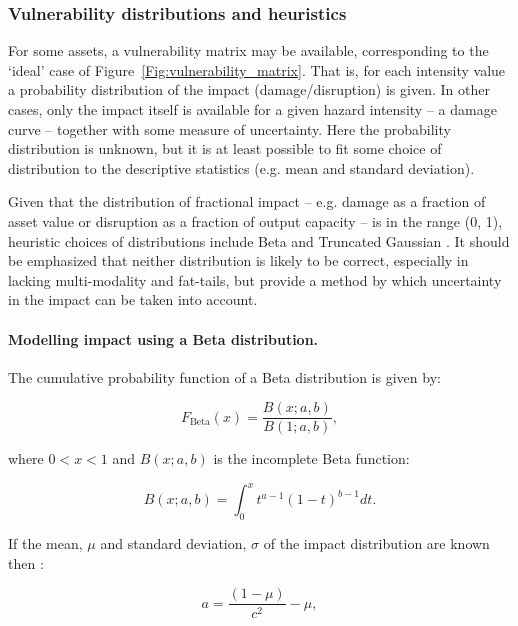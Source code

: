 \documentclass[a4paper,11pt]{extarticle} %
\theoremstyle{definition}
\begin{document}
\subsubsection{Vulnerability distributions and heuristics}
For some assets, a vulnerability matrix may be available, corresponding to the `ideal' case  of Figure~\ref{Fig:vulnerability_matrix}. That is, for each intensity value a probability distribution of the impact (damage/disruption) is given. In other cases, only the impact itself is available for a given hazard intensity -- a damage curve -- together with some measure of uncertainty. Here the probability distribution is unknown, but it is at least possible to fit some choice of distribution to the descriptive statistics (e.g. mean and standard deviation).

Given that the distribution of fractional impact -- e.g. damage  as a fraction of asset value or disruption as a fraction of output capacity -- is in the range  (0, 1), heuristic choices of distributions include Beta and Truncated Gaussian \cite{MitchellEtAl:2017}. It should be emphasized that neither distribution is likely to be correct, especially in lacking multi-modality and fat-tails, but provide a method by which uncertainty in the impact can be taken into account.

\paragraph{Modelling impact using a Beta distribution.}
The cumulative probability function of a Beta distribution is given by:

\begin{equation}
    \label{Eq:Beta1}
    F_{\text{Beta}}(x) = \frac{B(x; a, b)}{B(1; a, b)} ,
\end{equation}

where $0 < x < 1$ and $B(x; a, b)$ is the incomplete Beta function:

\begin{equation}
    \label{Eq:IncompleteBeta}
    B(x; a, b) = \int_0^{x} t^{a-1} (1 - t)^{b-1} dt .
\end{equation}

If the mean, $\mu$ and standard deviation, $\sigma$ of the impact distribution are known then \cite{MitchellEtAl:2017}:

\begin{equation}
    \label{Eq:BetaA}
    a = \frac{(1 - \mu)}{c^2} - \mu ,
\end{equation}
\end{document}
